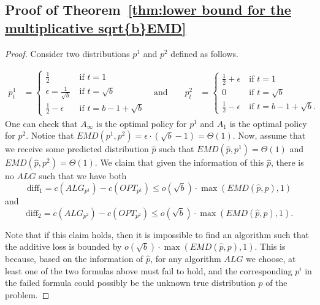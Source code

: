 \subsection*{Proof of Theorem~\ref{thm:lower bound for the multiplicative sqrt{b}EMD}}
\label{appendix:proof_lowerbound_3}
\begin{proof}
   Consider two distributions $p^1$ and $p^2$ defined as follows.

\begin{align*}
    p^1_t &= 
    \begin{cases} 
      \frac{1}{2} & \ \text{if } t = 1 \\
      \epsilon = \frac{1}{\sqrt{b}} & \ \text{if } t = \sqrt{b} \\
      \frac{1}{2} - \epsilon & \ \text{if } t = b -1 + \sqrt{b}
    \end{cases} 
    &  \text{and} \qquad
    p^2_t &= 
    \begin{cases} 
      \frac{1}{2} + \epsilon & \ \text{if } t = 1 \\
      0 & \ \text{if } t = \sqrt{b} \\
      \frac{1}{2} - \epsilon & \ \text{if } t = b -1 + \sqrt{b}.
    \end{cases}
    \end{align*}
One can check that $A_{\infty}$ is the optimal policy for $p^1$ and $A_1$ is the optimal policy for $p^2$. Notice that $EMD(p^1,p^2) = \epsilon \cdot (\sqrt{b}-1) = \Theta(1)$. Now, assume that we receive some predicted distribution $\hat{p}$ such that $EMD(\hat{p},p^1) = \Theta(1)$ and $EMD(\hat{p},p^2) = \Theta(1)$. We claim that given the information of this $\hat{p}$, there is no $ALG$ such that we have both
\[\text{diff}_1 = c(ALG_{p^1}) - c(OPT_{p^1}) \leq o(\sqrt{b})\cdot \max(EMD(\hat{p},p),1)\]
and
\[\text{diff}_2 = c(ALG_{p^2}) - c(OPT_{p^2}) \leq o(\sqrt{b})\cdot \max(EMD(\hat{p},p),1).\]

Note that if this claim holds, then it is impossible to find an algorithm such that the additive loss is bounded by $o(\sqrt{b})\cdot \max(EMD(\hat{p},p),1)$. This is because, based on the information of $\hat{p}$, for any algorithm $ALG$ we choose, at least one of the two formulas above must fail to hold, and the corresponding $p^i$ in the failed formula could possibly be the unknown true distribution $p$ of the problem.


\end{proof}
